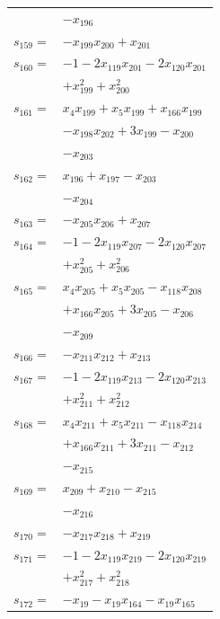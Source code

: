 \begin{longtable}{@{}r@{\;}l@{}}
 & \(\displaystyle -x_{196}\) \\[3pt]
\(s_{159}=\) & \(\displaystyle -x_{199}x_{200} +x_{201}\) \\[3pt]
\(s_{160}=\) & \(\displaystyle -1 -2x_{119}x_{201} -2x_{120}x_{201}\) \\
 & \(\displaystyle +x_{199}^{2} +x_{200}^{2}\) \\[3pt]
\(s_{161}=\) & \(\displaystyle x_{4}x_{199} +x_{5}x_{199} +x_{166}x_{199}\) \\
 & \(\displaystyle -x_{198}x_{202} +3x_{199} -x_{200}\) \\
 & \(\displaystyle -x_{203}\) \\[3pt]
\(s_{162}=\) & \(\displaystyle x_{196} +x_{197} -x_{203}\) \\
 & \(\displaystyle -x_{204}\) \\[3pt]
\(s_{163}=\) & \(\displaystyle -x_{205}x_{206} +x_{207}\) \\[3pt]
\(s_{164}=\) & \(\displaystyle -1 -2x_{119}x_{207} -2x_{120}x_{207}\) \\
 & \(\displaystyle +x_{205}^{2} +x_{206}^{2}\) \\[3pt]
\(s_{165}=\) & \(\displaystyle x_{4}x_{205} +x_{5}x_{205} -x_{118}x_{208}\) \\
 & \(\displaystyle +x_{166}x_{205} +3x_{205} -x_{206}\) \\
 & \(\displaystyle -x_{209}\) \\[3pt]
\(s_{166}=\) & \(\displaystyle -x_{211}x_{212} +x_{213}\) \\[3pt]
\(s_{167}=\) & \(\displaystyle -1 -2x_{119}x_{213} -2x_{120}x_{213}\) \\
 & \(\displaystyle +x_{211}^{2} +x_{212}^{2}\) \\[3pt]
\(s_{168}=\) & \(\displaystyle x_{4}x_{211} +x_{5}x_{211} -x_{118}x_{214}\) \\
 & \(\displaystyle +x_{166}x_{211} +3x_{211} -x_{212}\) \\
 & \(\displaystyle -x_{215}\) \\[3pt]
\(s_{169}=\) & \(\displaystyle x_{209} +x_{210} -x_{215}\) \\
 & \(\displaystyle -x_{216}\) \\[3pt]
\(s_{170}=\) & \(\displaystyle -x_{217}x_{218} +x_{219}\) \\[3pt]
\(s_{171}=\) & \(\displaystyle -1 -2x_{119}x_{219} -2x_{120}x_{219}\) \\
 & \(\displaystyle +x_{217}^{2} +x_{218}^{2}\) \\[3pt]
\(s_{172}=\) & \(\displaystyle -x_{19} -x_{19}x_{164} -x_{19}x_{165}\) \\

\end{longtable}
